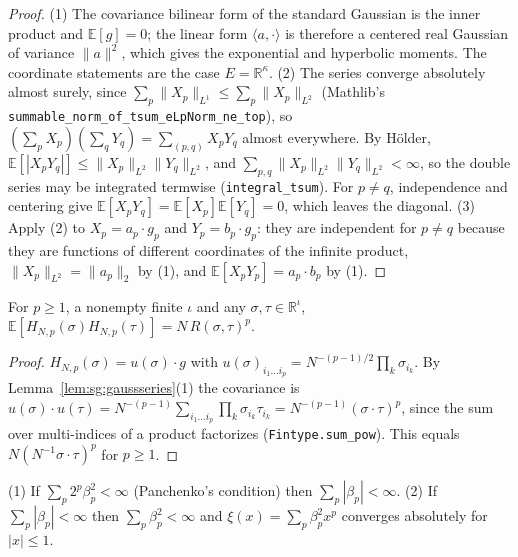 \begin{proof}
  \leanok
(1) The covariance bilinear form of the standard Gaussian is the inner product and $\mathbb E[g]=0$; the linear form
$\langle a,\cdot\rangle$ is therefore a centered real Gaussian of variance $\|a\|^2$, which gives the exponential and
hyperbolic moments. The coordinate statements are the case $E=\mathbb R^\kappa$. (2) The series converge absolutely almost surely, since $\sum_p\|X_p\|_{L^1}\le\sum_p\|X_p\|_{L^2}$
(Mathlib's \texttt{summable\_norm\_of\_tsum\_eLpNorm\_ne\_top}), so $(\sum_pX_p)(\sum_qY_q)=\sum_{(p,q)}X_pY_q$ almost
everywhere. By H\"older, $\mathbb E[|X_pY_q|]\le\|X_p\|_{L^2}\|Y_q\|_{L^2}$, and $\sum_{p,q}\|X_p\|_{L^2}\|Y_q\|_{L^2}<\infty$, so the
double series may be integrated termwise (\texttt{integral\_tsum}). For $p\ne q$, independence and centering give
$\mathbb E[X_pY_q]=\mathbb E[X_p]\mathbb E[Y_q]=0$, which leaves the diagonal. (3) Apply (2) to $X_p=a_p\cdot g_p$ and
$Y_p=b_p\cdot g_p$: they are independent for $p\ne q$ because they are functions of different coordinates of the
infinite product, $\|X_p\|_{L^2}=\|a_p\|_2$ by (1), and $\mathbb E[X_pY_p]=a_p\cdot b_p$ by (1).
\end{proof}

\begin{theorem}\label{thm:sg:purecov}
  \leanok
For $p\ge1$, a nonempty finite $\iota$ and any $\sigma,\tau\in\mathbb R^\iota$,
$\mathbb E[H_{N,p}(\sigma)H_{N,p}(\tau)]=N\,R(\sigma,\tau)^p$.
\end{theorem}

\begin{proof}
  \leanok
$H_{N,p}(\sigma)=u(\sigma)\cdot g$ with $u(\sigma)_{i_1\dots i_p}=N^{-(p-1)/2}\prod_k\sigma_{i_k}$. By
Lemma~\ref{lem:sg:gaussseries}(1) the covariance is $u(\sigma)\cdot u(\tau)=N^{-(p-1)}\sum_{i_1\dots i_p}\prod_k\sigma_{i_k}\tau_{i_k}
=N^{-(p-1)}(\sigma\cdot\tau)^p$, since the sum over multi-indices of a product factorizes
(\texttt{Fintype.sum\_pow}). This equals $N(N^{-1}\sigma\cdot\tau)^p$ for $p\ge1$.
\end{proof}

\begin{lemma}[Summability]\label{lem:sg:summable}
  \leanok
(1) If $\sum_p2^p\beta_p^2<\infty$ (Panchenko's condition) then $\sum_p|\beta_p|<\infty$.
(2) If $\sum_p|\beta_p|<\infty$ then $\sum_p\beta_p^2<\infty$ and $\xi(x)=\sum_p\beta_p^2x^p$ converges absolutely for
$|x|\le1$.
\end{lemma}


